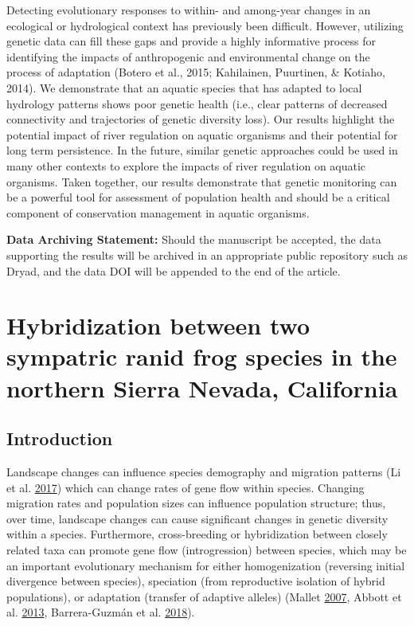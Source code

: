 \documentclass[proquest,12pt,final]{ucthesis-CA2012} %
\begin{document}
\begin{ucmainmatter}
Detecting evolutionary responses to within- and among-year changes in an
ecological or hydrological context has previously been difficult.
However, utilizing genetic data can fill these gaps and provide a highly
informative process for identifying the impacts of anthropogenic and
environmental change on the process of adaptation (Botero et al., 2015;
Kahilainen, Puurtinen, \& Kotiaho, 2014). We demonstrate that an aquatic
species that has adapted to local hydrology patterns shows poor genetic
health (i.e., clear patterns of decreased connectivity and trajectories
of genetic diversity loss). Our results highlight the potential impact
of river regulation on aquatic organisms and their potential for long
term persistence. In the future, similar genetic approaches could be
used in many other contexts to explore the impacts of river regulation
on aquatic organisms. Taken together, our results demonstrate that
genetic monitoring can be a powerful tool for assessment of population
health and should be a critical component of conservation management in
aquatic organisms.

\textbf{Data Archiving Statement:} Should the manuscript be accepted,
the data supporting the results will be archived in an appropriate
public repository such as Dryad, and the data DOI will be appended to
the end of the article.

\hypertarget{hybrids}{%
\chapter{Hybridization between two sympatric ranid frog species in the
northern Sierra Nevada, California}\label{hybrids}}

\hypertarget{introduction-1}{%
\section{Introduction}\label{introduction-1}}

Landscape changes can influence species demography and migration
patterns (Li et al. \protect\hyperlink{ref-li_ten_2017}{2017}) which can
change rates of gene flow within species. Changing migration rates and
population sizes can influence population structure; thus, over time,
landscape changes can cause significant changes in genetic diversity
within a species. Furthermore, cross-breeding or hybridization between
closely related taxa can promote gene flow (introgression) between
species, which may be an important evolutionary mechanism for either
homogenization (reversing initial divergence between species),
speciation (from reproductive isolation of hybrid populations), or
adaptation (transfer of adaptive alleles) (Mallet
\protect\hyperlink{ref-mallet_hybrid_2007}{2007}, Abbott et al.
\protect\hyperlink{ref-abbott_hybridization_2013}{2013}, Barrera-Guzmán
et al. \protect\hyperlink{ref-barrera-guzman_hybrid_2018}{2018}).


\end{ucmainmatter}
\end{document}
